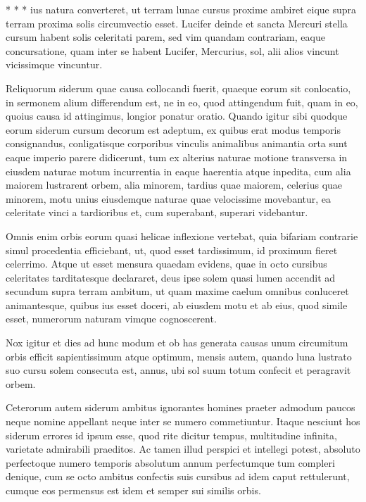  * * * ius natura converteret, ut terram lunae cursus proxime ambiret eique supra terram proxima solis circumvectio esset. Lucifer deinde et sancta Mercuri stella cursum habent solis celeritati parem, sed vim quandam contrariam, eaque concursatione, quam inter se habent Lucifer, Mercurius, sol, alii alios vincunt vicissimque vincuntur.

 Reliquorum siderum quae causa collocandi fuerit, quaeque eorum sit conlocatio, in sermonem alium differendum est, ne in eo, quod attingendum fuit, quam in eo, quoius causa id attingimus, longior ponatur oratio. Quando igitur sibi quodque eorum siderum cursum decorum est adeptum, ex quibus erat modus temporis consignandus, conligatisque corporibus vinculis animalibus animantia orta sunt eaque imperio parere didicerunt, tum ex alterius naturae motione transversa in eiusdem naturae motum incurrentia in eaque haerentia atque inpedita, cum alia maiorem lustrarent orbem, alia minorem, tardius quae maiorem, celerius quae minorem, motu unius eiusdemque naturae quae velocissime movebantur, ea celeritate vinci a tardioribus et, cum superabant, superari videbantur.

 Omnis enim orbis eorum quasi helicae inflexione vertebat, quia bifariam contrarie simul procedentia efficiebant, ut, quod esset tardissimum, id proximum fieret celerrimo. Atque ut esset mensura quaedam evidens, quae in octo cursibus celeritates tarditatesque declararet, deus ipse solem quasi lumen accendit ad secundum supra terram ambitum, ut quam maxime caelum omnibus conluceret animantesque, quibus ius esset doceri, ab eiusdem motu et ab eius, quod simile esset, numerorum naturam vimque cognoscerent.

 Nox igitur et dies ad hunc modum et ob has generata causas unum circumitum orbis efficit sapientissimum atque optimum, mensis autem, quando luna lustrato suo cursu solem consecuta est, annus, ubi sol suum totum confecit et peragravit orbem.

 Ceterorum autem siderum ambitus ignorantes homines praeter admodum paucos neque nomine appellant neque inter se numero commetiuntur. Itaque nesciunt hos siderum errores id ipsum esse, quod rite dicitur tempus, multitudine infinita, varietate admirabili praeditos. Ac tamen illud perspici et intellegi potest, absoluto perfectoque numero temporis absolutum annum perfectumque tum compleri denique, cum se octo ambitus confectis suis cursibus ad idem caput rettulerunt, cumque eos permensus est idem et semper sui similis orbis.

